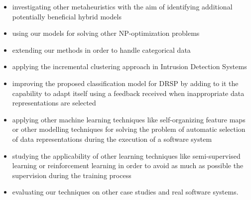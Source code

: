 \begin{itemize}
\item investigating other metaheuristics with the aim of identifying additional potentially beneficial hybrid models

\item using our models for solving other NP-optimization problems

\item extending our methods in order to handle categorical data

\item applying the incremental clustering approach in Intrusion Detection Systems

\item improving the proposed classification model for DRSP by adding to it the capability to adapt itself using a feedback received when inappropriate data representations are selected

\item applying other machine learning techniques like self-organizing feature maps or other modelling techniques for solving the problem of automatic selection of data representations during the execution of a software system

\item studying the applicability of other learning techniques like semi-supervised learning or reinforcement learning  in order to avoid as much as possible the supervision during the training process

\item evaluating our techniques on other case studies and real software systems.

\end{itemize}












